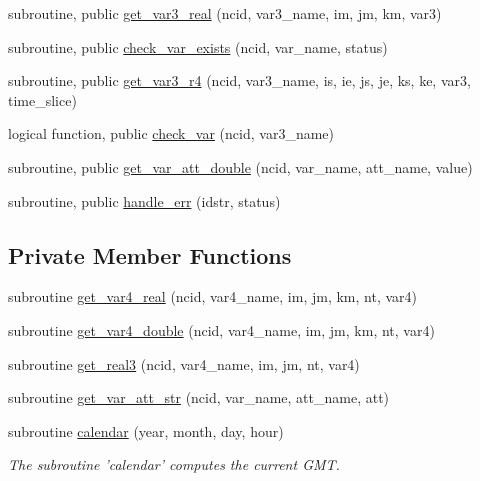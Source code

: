 \begin{DoxyCompactItemize}
\item 
subroutine, public \hyperlink{classsim__nc__mod_a2ce0a869b2a092c675a2fd05fa9eba78}{get\-\_\-var3\-\_\-real} (ncid, var3\-\_\-name, im, jm, km, var3)
\item 
subroutine, public \hyperlink{classsim__nc__mod_aa1c1534dbde8d5215e5c8fd8d56473b0}{check\-\_\-var\-\_\-exists} (ncid, var\-\_\-name, status)
\item 
subroutine, public \hyperlink{classsim__nc__mod_aeef43827235a8f2bc87c811ae6f047c0}{get\-\_\-var3\-\_\-r4} (ncid, var3\-\_\-name, is, ie, js, je, ks, ke, var3, time\-\_\-slice)
\item 
logical function, public \hyperlink{classsim__nc__mod_a6ba00a9ac634a7f1aa7a8aa588cc6423}{check\-\_\-var} (ncid, var3\-\_\-name)
\item 
subroutine, public \hyperlink{classsim__nc__mod_af74cc9f00ca3198748d69d55e063485a}{get\-\_\-var\-\_\-att\-\_\-double} (ncid, var\-\_\-name, att\-\_\-name, value)
\item 
subroutine, public \hyperlink{classsim__nc__mod_a278601db1538c2ce2821467fa506c393}{handle\-\_\-err} (idstr, status)
\end{DoxyCompactItemize}
\subsection*{Private Member Functions}
\begin{DoxyCompactItemize}
\item 
subroutine \hyperlink{classsim__nc__mod_a150306f1b53f93c31ed34e1a3d854c4d}{get\-\_\-var4\-\_\-real} (ncid, var4\-\_\-name, im, jm, km, nt, var4)
\item 
subroutine \hyperlink{classsim__nc__mod_a6966d31b89e3d2c1d12ae4817da51ed5}{get\-\_\-var4\-\_\-double} (ncid, var4\-\_\-name, im, jm, km, nt, var4)
\item 
subroutine \hyperlink{classsim__nc__mod_a921e83485407607449ed2085ce13e065}{get\-\_\-real3} (ncid, var4\-\_\-name, im, jm, nt, var4)
\item 
subroutine \hyperlink{classsim__nc__mod_a8cd192cd41636a101590b25b49819727}{get\-\_\-var\-\_\-att\-\_\-str} (ncid, var\-\_\-name, att\-\_\-name, att)
\item 
subroutine \hyperlink{classsim__nc__mod_a86a17476a157016bb327b188cf6face9}{calendar} (year, month, day, hour)
\begin{DoxyCompactList}\small\item\em The subroutine 'calendar' computes the current G\-M\-T. \end{DoxyCompactList}\end{DoxyCompactItemize}


